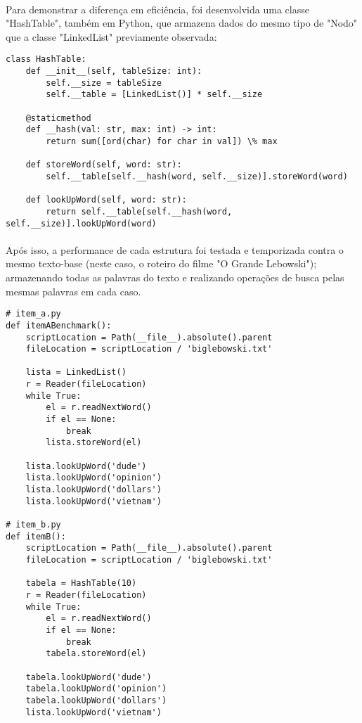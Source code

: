 \documentclass[12pt, letterpaper]{article}
\begin{document}
\paragraph{}
Para demonstrar a diferença em eficiência, foi desenvolvida uma classe "HashTable",
também em Python, que armazena dados do mesmo tipo de "Nodo" que a classe "LinkedList"
previamente observada:

\begin{lstlisting}
class HashTable:
    def __init__(self, tableSize: int):
        self.__size = tableSize
        self.__table = [LinkedList()] * self.__size

    @staticmethod
    def __hash(val: str, max: int) -> int:
        return sum([ord(char) for char in val]) \% max

    def storeWord(self, word: str):
        self.__table[self.__hash(word, self.__size)].storeWord(word)

    def lookUpWord(self, word: str):
        return self.__table[self.__hash(word, self.__size)].lookUpWord(word)
\end{lstlisting}

\paragraph{}
Após isso, a performance de cada estrutura foi testada e temporizada contra o mesmo
texto-base (neste caso, o roteiro do filme "O Grande Lebowski"); armazenando
todas as palavras do texto e realizando operações de busca pelas mesmas palavras
em cada caso.

\begin{lstlisting}
# item_a.py
def itemABenchmark():
    scriptLocation = Path(__file__).absolute().parent
    fileLocation = scriptLocation / 'biglebowski.txt'

    lista = LinkedList()
    r = Reader(fileLocation)
    while True:
        el = r.readNextWord()
        if el == None:
            break
        lista.storeWord(el)

    lista.lookUpWord('dude')
    lista.lookUpWord('opinion')
    lista.lookUpWord('dollars')
    lista.lookUpWord('vietnam')

# item_b.py
def itemB():
    scriptLocation = Path(__file__).absolute().parent
    fileLocation = scriptLocation / 'biglebowski.txt'

    tabela = HashTable(10)
    r = Reader(fileLocation)
    while True:
        el = r.readNextWord()
        if el == None:
            break
        tabela.storeWord(el)

    tabela.lookUpWord('dude')
    tabela.lookUpWord('opinion')
    tabela.lookUpWord('dollars')
    lista.lookUpWord('vietnam')
\end{lstlisting}
\end{document}
